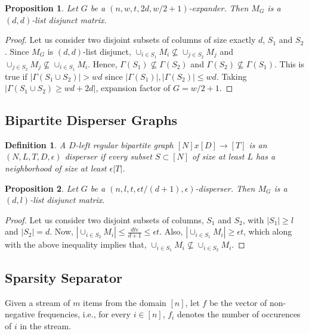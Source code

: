 \documentclass{article}
\newtheorem{proposition}{Proposition}
\newtheorem{definition}{Definition}
\begin{document}
\begin{proposition}
  Let $G$ be a $(n,w,t,2d,w/2+1)$-expander.
  Then $M_G$ is a $(d,d)$-list disjunct matrix.\cite{indyk2010efficiently}
\end{proposition}
\begin{proof}
  Let us consider two disjoint subsets of columns of size exactly $d$, $S_1$ and $S_2$.
  Since $M_G$ is $(d,d)$-list disjunct, $\cup_{i\in S_1} M_i \not \subseteq \cup_{j\in S_2} M_j$
  and $\cup_{j\in S_2} M_j \not \subseteq \cup_{i\in S_1} M_i$.
  Hence, $\Gamma(S_1) \not \subseteq \Gamma(S_2)$ and $\Gamma(S_2) \not \subseteq \Gamma(S_1)$.
  This is true if $|\Gamma(S_1 \cup S_2)| > wd$ since $|\Gamma(S_1)|, |\Gamma(S_2)| \le wd$.
  Taking $|\Gamma(S_1 \cup S_2) \ge wd + 2d|$, expansion factor of $G = w/2+1$.
\end{proof}

\subsection{Bipartite Disperser Graphs}

\begin{definition}
  A $D$-left regular bipartite graph $[N]x[D] \rightarrow [T]$ is an
  $(N, L, T, D, \epsilon)$ disperser if every subset $S \subset [N]$
  of size at least $L$ has a neighborhood of size at least $\epsilon|T|$.
\end{definition}

\begin{proposition}
  Let $G$ be a $(n,l,t,\epsilon t/(d+1),\epsilon)$-disperser.
  Then $M_G$ is a $(d,l)$-list disjunct matrix.\cite{indyk2010efficiently}
\end{proposition}
\begin{proof}
  Let us consider two disjoint subsets of columns, $S_1$ and $S_2$, with $|S_1| \ge l$ and $|S_2| = d$.
  Now, $|\cup_{i \in S_2}M_i| \le \frac{dt\epsilon}{d+1} \le \epsilon t$.
  Also, $|\cup_{i\in S_1}M_i| \ge \epsilon t$, which along with the above inequality implies that,
  $\cup_{i \in S_1}M_i \not \subseteq \cup_{i\in S_2}M_i$.
\end{proof}

\subsection{Sparsity Separator}

Given a stream of $m$ items from the domain $[n]$, let $f$ be the vector of non-negative
frequencies, i.e., for every $i \in [n]$, $f_i$ denotes the number of occurences
of $i$ in the stream.
\end{document}
